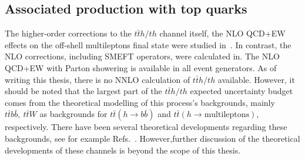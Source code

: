 \subsection{Associated production with top quarks}
The higher-order corrections to the $t\bar t h /t h$ channel itself, the NLO QCD+EW effects on the off-shell multileptons final state were studied in~\cite{Denner:2019zdz}. In contrast, the NLO corrections, including SMEFT operators, were calculated in\cite{Maltoni:2016yxb}. The NLO QCD+EW with Parton showering is available in all event generators. As of writing this thesis, there is no NNLO calculation of $t\bar t h /t h$ available. 
However, it should be noted that the largest part of the $t\bar t h/th$ expected uncertainty budget comes from the theoretical modelling of this process's backgrounds, mainly $t \bar t b\bar b,\ t\bar t W$ as backgrounds for $ t\bar t (h \to b\bar b)$ and $ t \bar t ( h \to \mathrm{multileptons})$, respectively. There have been several theoretical developments regarding these backgrounds, see for example Refs.~\cite{Broggio:2019ewu,Kulesza:2020nfh,Bevilacqua:2020pzy,Denner:2020hgg,Bevilacqua:2020srb,Denner:2021hqi,Cordero:2021ia,Bevilacqua:2021tzp.Denner:2020orv, Bevilacqua:2021cit}. However,further discussion of the theoretical developments of these channels is beyond the scope of this thesis.




